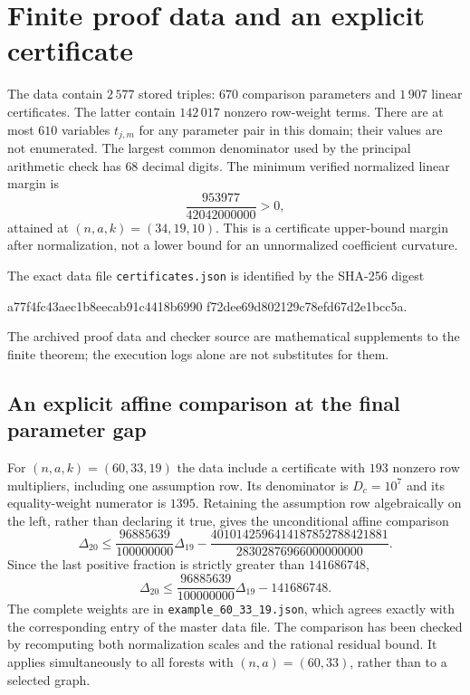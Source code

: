 \section{Finite proof data and an explicit certificate}\label{app:finite-data}
The data contain $2\,577$ stored triples: $670$ comparison parameters
and $1\,907$ linear certificates.  The latter contain $142\,017$
nonzero row-weight terms.  There are at most $610$ variables $t_{j,m}$
for any parameter pair in this domain; their values are not enumerated.
The largest common denominator used by the principal arithmetic check
has $68$ decimal digits.  The minimum verified normalized linear
margin is
\[
 \frac{953977}{42042000000}>0,
\]
attained at $(n,a,k)=(34,19,10)$.  This is a certificate upper-bound
margin after normalization, not a lower bound for an unnormalized
coefficient curvature.

The exact data file \texttt{certificates.json} is identified by the
SHA-256 digest
\begin{center}\small\ttfamily
a77f4fc43aec1b8eecab91c4418b6990\allowbreak
f72dee69d802129c78efd67d2e1bcc5a.
\end{center}
The archived proof data and checker source are mathematical supplements
to the finite theorem; the execution logs alone are not substitutes for
them.

\subsection{An explicit affine comparison at the final parameter gap}
\label{f60:subsec-example}

For $(n,a,k)=(60,33,19)$ the data include a certificate with $193$
nonzero row multipliers, including one assumption row.  Its denominator
is $D_c=10^7$ and its equality-weight numerator is $1395$.
Retaining the assumption row algebraically on the left, rather than
declaring it true, gives the unconditional affine comparison
\begin{equation}
 \Delta_{20}\le\frac{96885639}{100000000}\Delta_{19}
 -\frac{4010142596414187852788421881}{28302876966000000000}.
 \label{f60:eq-example-exact}
\end{equation}
Since the last positive fraction is strictly greater than $141686748$,
\begin{equation}
 \Delta_{20}\le\frac{96885639}{100000000}\Delta_{19}-141686748.
 \label{f60:eq-example-rounded}
\end{equation}
The complete weights are in \texttt{example\_60\_33\_19.json}, which
agrees exactly with the corresponding entry of the master data file.
The comparison has been checked by recomputing both normalization
scales and the rational residual bound.  It applies simultaneously to
all forests with $(n,a)=(60,33)$, rather than to a selected graph.

